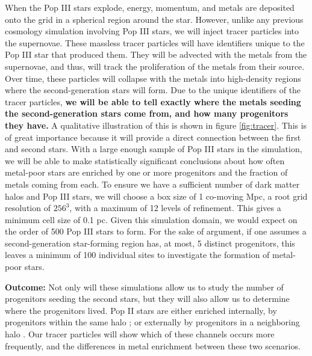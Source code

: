 \documentclass[a4paper, 12pt]{article}
\begin{document}
When the Pop III stars explode, energy, momentum, and metals are deposited onto the grid in a spherical region around the star. However, unlike any previous cosmology simulation involving Pop III stars, we will inject tracer particles into the supernovae. These massless tracer particles will have identifiers unique to the Pop III star that produced them. They will be advected with the metals from the supernovae, and thus, will track the proliferation of the metals from their source. Over time, these particles will collapse with the metals into high-density regions where the second-generation stars will form. Due to the unique identifiers of the tracer particles, \textbf{we will be able to tell exactly where the metals seeding the second-generation stars come from, and how many progenitors they have.} A qualitative illustration of this is shown in figure \ref{fig:tracer}. This is of great importance because it will provide a direct connection between the first and second stars. With a large enough sample of Pop III stars in the simulation, we will be able to make statistically significant conclusions about how often metal-poor stars are enriched by one or more progenitors and the fraction of metals coming from each. To ensure we have a sufficient number of dark matter halos and Pop III stars, we will choose a box size of 1 co-moving Mpc, a root grid resolution of $256^3$, with a maximum of 12 levels of refinement. This gives a minimum cell size of 0.1 pc. Given this simulation domain, we would expect on the order of 500 Pop III stars to form. For the sake of argument, if one assumes a second-generation star-forming region has, at most, 5 distinct progenitors, this leaves a minimum of 100 individual sites to investigate the formation of metal-poor stars.

\textbf{Outcome:} Not only will these simulations allow us to study the number of progenitors seeding the second stars, but they will also allow us to determine where the progenitors lived. Pop II stars are either enriched internally, by progenitors within the same halo \citep{Chiaki2019}; or externally by progenitors in a neighboring halo \citep{Smith2015}. Our tracer particles will show which of these channels occurs more frequently, and the differences in metal enrichment between these two scenarios. 
\end{document}
